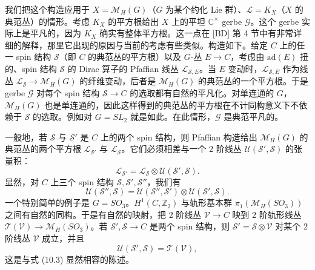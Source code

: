 \documentclass[11pt,a4paper]{article}
\begin{document}
我们把这个构造应用于 $X=\mathcal{M}_H(G)$（$G$ 为某个约化 Lie 群）、$\mathcal{L}=K_X$（$X$ 的典范丛）的情形。考虑 $K_X$ 的平方根给出 $X$ 上的平坦 $\mathbb{C}^\times$ gerbe $\mathcal{G}$。这个 gerbe 实际上是平凡的，因为 $K_X$ 确实有整体平方根。这一点在 [BD] 第 4 节中有非常详细的解释，那里它出现的原因与当前的考虑有些类似。构造如下。给定 $C$ 上的任一 spin 结构 $\mathcal{S}$（即 $C$ 的典范丛的平方根）以及 $G$-丛 $E\to C$，考虑由 $\mathrm{ad}(E)$ 扭的、spin 结构 $\mathcal{S}$ 的 Dirac 算子的 Pfaﬃan 线丛 $\mathcal{L}_{\mathcal{S},E}$。当 $E$ 变动时，$\mathcal{L}_{\mathcal{S},E}$ 作为线丛 $\mathcal{L}_{\mathcal{S}}\to\mathcal{M}_H(G)$ 的纤维变动，后者是 $\mathcal{M}_H(G)$ 的典范丛的一个平方根。于是 gerbe $\mathcal{G}$ 对每个 spin 结构 $\mathcal{S}\to C$ 的选取都有自然的平凡化。对单连通的 $G$，$\mathcal{M}_H(G)$ 也是单连通的，因此这样得到的典范丛的平方根在不计同构意义下不依赖于 $\mathcal{S}$ 的选取。例如对 $G=SL_2$ 就是如此。在此情形，$\mathcal{G}$ 是典范平凡的。

一般地，若 $\mathcal{S}$ 与 $\mathcal{S}'$ 是 $C$ 上的两个 spin 结构，则 Pfaﬃan 构造给出 $\mathcal{M}_H(G)$ 的典范丛的两个平方根 $\mathcal{L}_{\mathcal{S}'}$ 与 $\mathcal{L}_{\mathcal{S}}$。它们必须相差与一个 2 阶线丛 $\mathcal{U}(\mathcal{S}',\mathcal{S})$ 的张量积：
\begin{equation}\tag{10.2}
\mathcal{L}_{\mathcal{S}'} = \mathcal{L}_{\mathcal{S}}\otimes\mathcal{U}(\mathcal{S}',\mathcal{S}).
\end{equation}
显然，对 $C$ 上三个 spin 结构 $\mathcal{S},\mathcal{S}',\mathcal{S}''$，我们有
\begin{equation}\tag{10.3}
\mathcal{U}(\mathcal{S}'',\mathcal{S}) = \mathcal{U}(\mathcal{S}'',\mathcal{S}')\otimes\mathcal{U}(\mathcal{S}',\mathcal{S}).
\end{equation}
一个特别简单的例子是 $G=SO_3$。$H^1(C,\mathbb{Z}_2)$ 与轨形基本群 $\pi_1(\mathcal{M}_H(SO_3))$ 之间有自然的同构。于是有自然的映射，把 2 阶线丛 $\mathcal{V}\to C$ 映到 2 阶轨形线丛 $\mathcal{T}(\mathcal{V})\to\mathcal{M}_H(SO_3)$。若 $\mathcal{S}',\mathcal{S}\to C$ 是两个 spin 结构，则 $\mathcal{S}'=\mathcal{S}\otimes\mathcal{V}$ 对某个 2 阶线丛 $\mathcal{V}$ 成立，并且
\begin{equation}\tag{10.4}
\mathcal{U}(\mathcal{S}',\mathcal{S}) = \mathcal{T}(\mathcal{V}),
\end{equation}
这是与式 (10.3) 显然相容的陈述。
\end{document}
